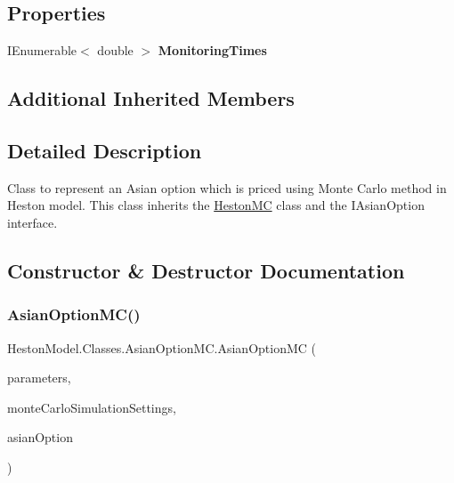 \subsection*{Properties}
\begin{DoxyCompactItemize}
\item 
\mbox{\label{class_heston_model_1_1_classes_1_1_asian_option_m_c_a3c97dd33935ab1c74fcb4bb163e06cef}} 
I\+Enumerable$<$ double $>$ {\bfseries Monitoring\+Times}
\end{DoxyCompactItemize}
\subsection*{Additional Inherited Members}


\subsection{Detailed Description}
Class to represent an Asian option which is priced using Monte Carlo method in Heston model. This class inherits the \mbox{\hyperlink{class_heston_model_1_1_classes_1_1_heston_m_c}{Heston\+MC}} class and the I\+Asian\+Option interface. 



\subsection{Constructor \& Destructor Documentation}
\mbox{\label{class_heston_model_1_1_classes_1_1_asian_option_m_c_af3166ab5ed7a208cffc69e08e01b089b}} 
\subsubsection{\texorpdfstring{Asian\+Option\+M\+C()}{AsianOptionMC()}}
{\footnotesize\ttfamily Heston\+Model.\+Classes.\+Asian\+Option\+M\+C.\+Asian\+Option\+MC (\begin{DoxyParamCaption}\item[{\mbox{\hyperlink{class_heston_model_1_1_classes_1_1_interface_classes_1_1_heston_model_parameters}{Heston\+Model\+Parameters}}}]{parameters,  }\item[{\mbox{\hyperlink{class_heston_model_1_1_classes_1_1_interface_classes_1_1_monte_carlo_settings}{Monte\+Carlo\+Settings}}}]{monte\+Carlo\+Simulation\+Settings,  }\item[{\mbox{\hyperlink{class_heston_model_1_1_classes_1_1_interface_classes_1_1_asian_option}{Asian\+Option}}}]{asian\+Option }\end{DoxyParamCaption})\hspace{0.3cm}{\ttfamily [inline]}}



